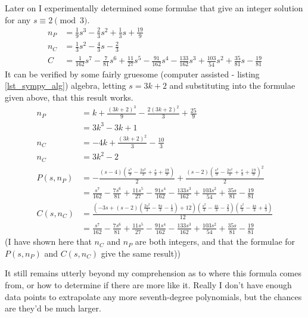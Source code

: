 Later on I experimentally determined some formulae that give an integer solution
for any \(s \equiv 2 \pmod 3\).
\begin{align*}
n_P &= \tfrac 19s^3 - \tfrac 23s^2 + \tfrac 13s + \tfrac{19}9 \\
n_C &= \tfrac 13s^2 - \tfrac 43s - \tfrac 23 \\
C &= \tfrac{1}{162}s^7 - \tfrac{7}{81}s^6 + \tfrac{11}{27}s^5 - \tfrac{91}{162}s^4
    - \tfrac{133}{162}s^3 + \tfrac{103}{54}s^2 + \tfrac{35}{81}s - \tfrac{19}{81}
\end{align*}
It can be verified by some fairly gruesome (computer assisted - listing
\ref{lst_sympy_alg}) algebra, letting \(s = 3k+2\) and substituting into the
formulae given above, that this result works.
\begin{align*}
n_P &= k + \frac{\left(3 k + 2\right)^{3}}{9} - \frac{2 \left(3 k + 2\right)^{2}}{3} + \frac{25}{9} \\
    &= 3 k^{3} - 3 k + 1 \\
n_C &= - 4 k + \frac{\left(3 k + 2\right)^{2}}{3} - \frac{10}{3} \\
n_C &= 3 k^{2} - 2 \\
P(s, n_P) &= - \frac{\left(s - 4\right) \left(\frac{s^{3}}{9} - \frac{2 s^{2}}{3} + \frac{s}{3} + \frac{19}{9}\right)}{2} + \frac{\left(s - 2\right) \left(\frac{s^{3}}{9} - \frac{2 s^{2}}{3} + \frac{s}{3} + \frac{19}{9}\right)^{2}}{2} \\[3ex]
          &= \frac{s^{7}}{162} - \frac{7 s^{6}}{81} + \frac{11 s^{5}}{27} - \frac{91 s^{4}}{162} - \frac{133 s^{3}}{162} + \frac{103 s^{2}}{54} + \frac{35 s}{81} - \frac{19}{81} \\[3ex]
C(s, n_C) &= \frac{\left(- 3 s + \left(s - 2\right) \left(\frac{2 s^{2}}{3} - \frac{8 s}{3} - \frac{1}{3}\right) + 12\right) \left(\frac{s^{2}}{3} - \frac{4 s}{3} - \frac{2}{3}\right) \left(\frac{s^{2}}{3} - \frac{4 s}{3} + \frac{1}{3}\right)}{12} \\[3ex]
          &= \frac{s^{7}}{162} - \frac{7 s^{6}}{81} + \frac{11 s^{5}}{27} - \frac{91 s^{4}}{162} - \frac{133 s^{3}}{162} + \frac{103 s^{2}}{54} + \frac{35 s}{81} - \frac{19}{81}
\end{align*}
(I have shown here that \(n_C\) and \(n_P\) are both integers, and that the
formulae for \(P(s, n_P)\) and \(C(s, n_C)\) give the same result))

It still remains utterly beyond my comprehension as to where this formula comes
from, or how to determine if there are more like it. Really I don't have enough
data points to extrapolate any more seventh-degree polynomials, but the chances
are they'd be much larger.


